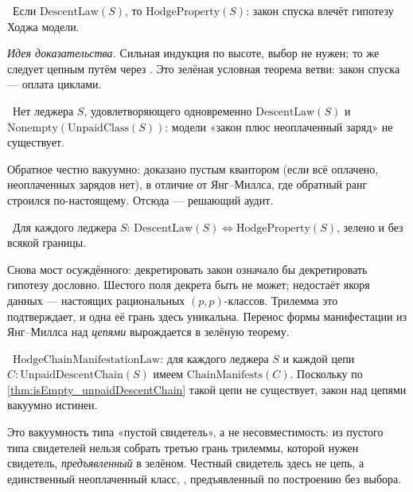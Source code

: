 \begin{theorem}\label{thm:hodgeProperty_of_descentLaw}
\green{}\ Если $\mathrm{DescentLaw}(S)$, то $\mathrm{HodgeProperty}(S)$: закон спуска влечёт гипотезу
Ходжа модели.
\end{theorem}

\emph{Идея доказательства.} Сильная индукция по высоте, выбор не нужен; то же следует цепным путём
через . Это зелёная условная теорема ветви: закон спуска --- оплата циклами.

\begin{theorem}\label{thm:no_unpaid_lawful_model}
\green{}\ Нет леджера $S$, удовлетворяющего одновременно $\mathrm{DescentLaw}(S)$ и
$\mathrm{Nonempty}(\mathrm{UnpaidClass}(S))$: модели «закон плюс неоплаченный заряд» не существует.
\end{theorem}

Обратное честно вакуумно:  доказано пустым квантором (если всё
оплачено, неоплаченных зарядов нет), в отличие от Янг--Миллса, где обратный ранг строился по-настоящему.
Отсюда --- решающий аудит.

\begin{theorem}\label{thm:descentLaw_iff_hodgeProperty}
\green{}\ Для каждого леджера $S$: $\mathrm{DescentLaw}(S)\iff\mathrm{HodgeProperty}(S)$, зелено и без
всякой границы.
\end{theorem}

Снова мост осуждённого: декретировать закон означало бы декретировать гипотезу дословно. Шестого поля
декрета быть не может; недостаёт \red{} якоря данных --- настоящих рациональных $(p,p)$-классов.
Трилемма это подтверждает, и одна её грань здесь уникальна. Перенос формы манифестации из Янг--Миллса
над \emph{цепями} вырождается в зелёную теорему.

\begin{theorem}\label{thm:hodgeChainManifestationLaw_green}
\green{}\ $\mathrm{HodgeChainManifestationLaw}$: для каждого леджера $S$ и каждой цепи
$C:\mathrm{UnpaidDescentChain}(S)$ имеем $\mathrm{ChainManifests}(C)$. Поскольку по
\cref{thm:isEmpty_unpaidDescentChain} такой цепи не существует, закон над цепями вакуумно истинен.
\end{theorem}

Это вакуумность типа «пустой свидетель», а не несовместимость: из пустого типа свидетелей нельзя
собрать третью грань трилеммы, которой нужен свидетель, \emph{предъявленный} в зелёном. Честный свидетель
здесь не цепь, а единственный неоплаченный класс, , предъявленный по построению
без выбора.

